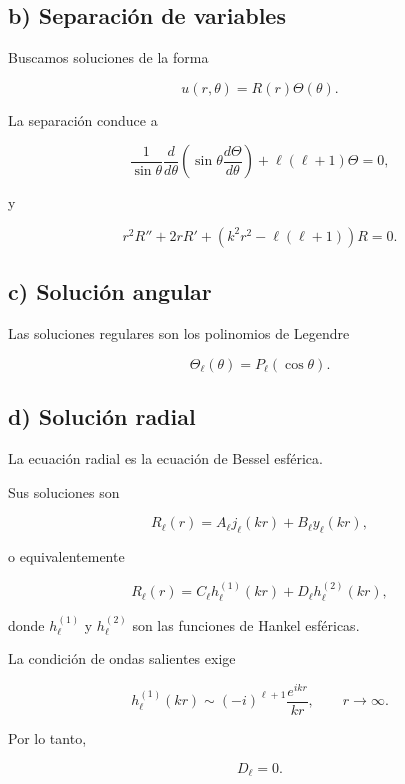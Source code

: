 \documentclass[11pt,spanish]{article}
\begin{document}

\subsection*{b) Separación de variables}

Buscamos soluciones de la forma

\[
u(r,\theta)=R(r)\Theta(\theta).
\]

La separación conduce a

\[
\frac1{\sin\theta}
\frac{d}{d\theta}
\left(
\sin\theta\frac{d\Theta}{d\theta}
\right)
+
\ell(\ell+1)\Theta
=
0,
\]

y

\[
r^2R''+2rR'
+
\left(k^2r^2-\ell(\ell+1)\right)R
=
0.
\]


\subsection*{c) Solución angular}

Las soluciones regulares son los polinomios de Legendre

\[
\Theta_\ell(\theta)
=
P_\ell(\cos\theta).
\]


\subsection*{d) Solución radial}

La ecuación radial es la ecuación de Bessel esférica.

Sus soluciones son

\[
R_\ell(r)
=
A_\ell j_\ell(kr)
+
B_\ell y_\ell(kr),
\]

o equivalentemente

\[
R_\ell(r)
=
C_\ell h_\ell^{(1)}(kr)
+
D_\ell h_\ell^{(2)}(kr),
\]

donde \(h_\ell^{(1)}\) y \(h_\ell^{(2)}\) son las funciones de Hankel esféricas.

La condición de ondas salientes exige

\[
h_\ell^{(1)}(kr)
\sim
(-i)^{\ell+1}
\frac{e^{ikr}}{kr},
\qquad
r\to\infty.
\]

Por lo tanto,

\[
D_\ell=0.
\]

\end{document}
